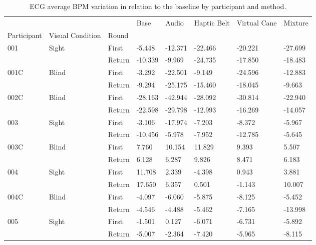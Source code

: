 
\begin{table}[!htb]
\centering
\caption{ECG average BPM variation in relation to the baseline by participant and method.}
\label{tab:ecg_bpm_variation}
\begin{tabular}{llllllll}
\toprule
    &       &        &    Base &   Audio & Haptic Belt & Virtual Cane & Mixture \\
Participant & Visual Condition & Round &         &         &             &              &         \\
\midrule
001 & Sight & First &  -5.448 & -12.371 &     -22.466 &      -20.221 & -27.699 \\
    &       & Return & -10.339 &  -9.969 &     -24.735 &      -17.850 & -18.483 \\
001C & Blind & First &  -3.292 & -22.501 &      -9.149 &      -24.596 & -12.883 \\
    &       & Return &  -9.294 & -25.175 &     -15.460 &      -18.045 &  -9.663 \\
002C & Blind & First & -28.163 & -42.944 &     -28.092 &      -30.814 & -22.940 \\
    &       & Return & -22.598 & -29.798 &     -12.993 &      -16.269 & -14.057 \\
003 & Sight & First &  -3.106 & -17.974 &      -7.203 &       -8.372 &  -5.967 \\
    &       & Return & -10.456 &  -5.978 &      -7.952 &      -12.785 &  -5.645 \\
003C & Blind & First &   7.760 &  10.154 &      11.829 &        9.393 &   5.507 \\
    &       & Return &   6.128 &   6.287 &       9.826 &        8.471 &   6.183 \\
004 & Sight & First &  11.708 &   2.339 &      -4.398 &        0.943 &   3.881 \\
    &       & Return &  17.650 &   6.357 &       0.501 &       -1.143 &  10.007 \\
004C & Blind & First &  -4.097 &  -6.060 &      -5.875 &       -8.125 &  -5.452 \\
    &       & Return &  -4.546 &  -4.488 &      -5.462 &       -7.165 & -13.998 \\
005 & Sight & First &  -1.501 &   0.127 &      -6.071 &       -6.731 &  -5.892 \\
    &       & Return &  -5.007 &  -2.364 &      -7.420 &       -5.965 &  -8.115 \\
\bottomrule
\end{tabular}
\end{table}

